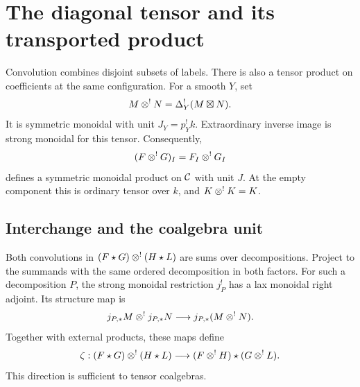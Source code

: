 

\section{The diagonal tensor and its transported product}\label{ogd:sec:diamond}

Convolution\label{ogd:def:h373p04-derived-diagonal-coefficient-tensor} combines disjoint subsets of labels.
There is also a tensor product on coefficients at the same configuration.
For\label{ogd:def:configuration-diagonal-tensor}\label{ogd:def:h373p04-diagonal-tensor}\label{ogd:def:diagonal-coefficient-tensor} a smooth \(Y\), set
\[
 M\mathbin{\otimes^!} N=\Delta_Y^!(M\boxtimes N).
\]
It is symmetric monoidal with unit \(J_Y=p_Y^!k\).
Extraordinary inverse image is strong monoidal for this tensor.
Consequently,
\[
 (F\mathbin{\otimes^!} G)_I=F_I\mathbin{\otimes^!} G_I
\]
defines\label{ogd:def:h373p04-componentwise-diagonal-tensor} a symmetric monoidal product on \(\mathcal C\) with unit \(J\).
At the empty component this is ordinary tensor over \(k\), and \(K\mathbin{\otimes^!} K=K\).

\subsection{Interchange and the coalgebra unit}

Both convolutions in \((F\star G)\mathbin{\otimes^!}(H\star L)\) are sums over decompositions.
Project to the summands with the same ordered decomposition in both factors.
For such a decomposition \(P\), the strong monoidal restriction \(j_P^!\) has a lax monoidal right adjoint.
Its structure map is
\[
 j_{P,*}M\mathbin{\otimes^!} j_{P,*}N\longrightarrow j_{P,*}(M\mathbin{\otimes^!} N).
\]
Together with external products, these maps define
\begin{equation}\label{ogd:eq:interchange}
 \zeta:(F\star G)\mathbin{\otimes^!}(H\star L)
       \longrightarrow(F\mathbin{\otimes^!} H)\star(G\mathbin{\otimes^!} L).
\end{equation}
This direction is sufficient to tensor coalgebras.

